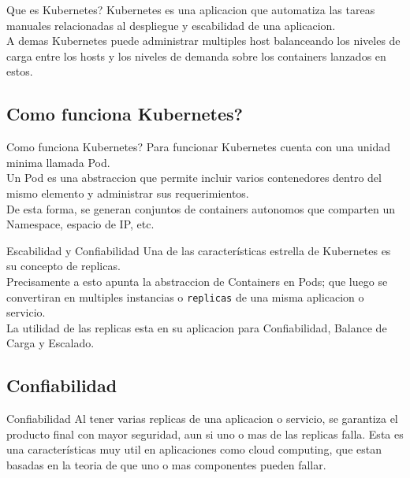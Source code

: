 \documentclass{beamer}
\begin{document}
\begin{frame}{Que es Kubernetes?}
	Kubernetes es una aplicacion que automatiza las tareas manuales relacionadas al despliegue y escabilidad de una aplicacion. \\
	A demas Kubernetes puede administrar multiples host balanceando los niveles de carga entre los hosts y los niveles de demanda
	sobre los containers lanzados en estos. 
\end{frame}


\subsection{Como funciona Kubernetes?}

\begin{frame}{Como funciona Kubernetes?}
	Para funcionar Kubernetes cuenta con una unidad minima llamada Pod. \\
	Un Pod es una abstraccion que permite incluir varios contenedores dentro del mismo elemento y administrar sus requerimientos. \\
	De esta forma, se generan conjuntos de containers autonomos que comparten un Namespace, espacio de IP, etc.
\end{frame}

\begin{frame}{Escabilidad y Confiabilidad}
	Una de las características estrella de Kubernetes es su concepto de replicas. \\
	Precisamente a esto apunta la abstraccion de Containers en Pods; que luego se convertiran en multiples instancias o \texttt{replicas} de una misma aplicacion
	o servicio. \\
	La utilidad de las replicas esta en su aplicacion para Confiabilidad, Balance de Carga y Escalado.
\end{frame}


\subsection{Confiabilidad}

\begin{frame}{Confiabilidad}
	Al tener varias replicas de una aplicacion o servicio, se garantiza el producto final con mayor seguridad, aun si uno o mas de las replicas falla.
	Esta es una características muy util en aplicaciones como cloud computing, que estan basadas en la teoria de que uno o mas componentes pueden fallar.
\end{frame}
\end{document}
